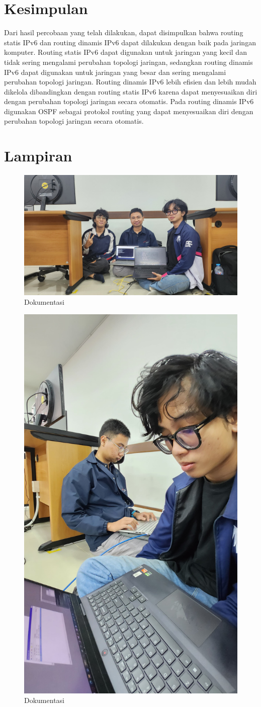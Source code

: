 \section{Kesimpulan}
Dari hasil percobaan yang telah dilakukan, dapat disimpulkan bahwa routing statis IPv6 dan routing dinamis IPv6
dapat dilakukan dengan baik pada jaringan komputer. Routing statis IPv6 dapat digunakan untuk jaringan yang
kecil dan tidak sering mengalami perubahan topologi jaringan, sedangkan routing dinamis IPv6 dapat digunakan untuk
jaringan yang besar dan sering mengalami perubahan topologi jaringan. Routing dinamis IPv6 lebih efisien dan lebih
mudah dikelola dibandingkan dengan routing statis IPv6 karena dapat menyesuaikan diri dengan perubahan topologi
jaringan secara otomatis. Pada routing dinamis IPv6 digunakan OSPF sebagai protokol routing yang dapat menyesuaikan diri
dengan perubahan topologi jaringan secara otomatis.
\section{Lampiran}

\begin{figure}[H]
        \centering
        \includegraphics[width=0.5\linewidth]{gambar8.jpeg}
        \caption{Dokumentasi}
        \label{fig:gambar1}
    \end{figure}

    \begin{figure}[H]
        \centering
        \includegraphics[width=0.5\linewidth]{gambar9.jpeg}
        \caption{Dokumentasi}
        \label{fig:gambar1}
    \end{figure}

